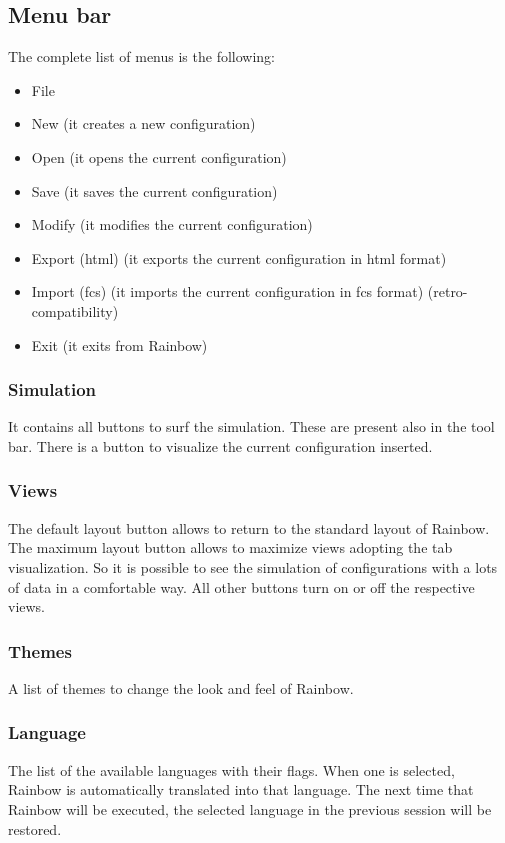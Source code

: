 \documentclass[10pt,a4paper,twoside,titlepage]{article}
\begin{document}
\subsection{Menu bar}
\label{subsec:Menu bar}
The complete list of menus is the following:
\begin{itemize}
 \item File
 \item New (it creates a new configuration) 
 \item Open (it opens the current configuration) 
 \item Save (it saves the current configuration) 
 \item Modify (it modifies the current configuration) 
 \item Export (html) (it exports the current configuration in html format)
 \item Import (fcs) (it imports the current configuration in fcs format) (retro-compatibility)
 \item Exit (it exits from Rainbow) 
\end{itemize}

\subsubsection{Simulation}
\label{subsubsec:Simulation} 
It contains all buttons to surf the simulation. These are present also in the tool bar. There is a button to visualize the current configuration inserted.

\subsubsection{Views}
\label{subsubsec:Views} 
The default layout button allows to return to the standard layout of Rainbow. The maximum layout button allows to maximize views adopting the tab visualization. So it is possible to see the simulation of configurations with a lots of data in a comfortable way. All other buttons turn on or off the respective views.

\subsubsection{Themes}
\label{subsubsec:Themes} 
A list of themes to change the look and feel of Rainbow.

\subsubsection{Language}
\label{subsubsec:Language} 
The list of the available languages with their flags. When one is selected, Rainbow is automatically translated into that language. The next time that Rainbow will be executed, the selected language in the previous session will be restored.
\end{document}
